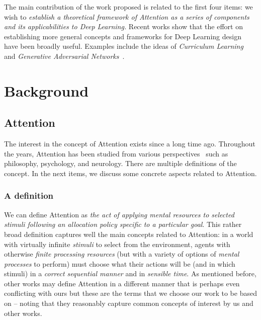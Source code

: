 \documentclass[English]{style/ic-tese-v3}
\begin{document}
The main contribution of the work proposed is related to the first four items:
we wish to
\emph{establish a theoretical framework of Attention as a series of components
    and its applicabilities to Deep Learning.}
Recent works show that the effort on establishing more general concepts and frameworks for
Deep Learning design have been broadly useful.
Examples include the ideas of \emph{Curriculum Learning}~\cite{ref:curriculum}
and \emph{Generative Adversarial Networks}~\cite{ref:gans}.

\chapter{Background}
\section{Attention}
\label{attention}
The interest in the concept of Attention exists since a long time ago.
Throughout the years, Attention has been studied
from various perspectives~\cite{ref:esther-thesis}
such as philosophy, psychology, and neurology.
There are multiple definitions of the concept.
In the next items, we discuss some concrete aspects related to Attention.

\subsection{A definition}
We can define Attention as
\emph{the act of applying mental resources to selected stimuli following an allocation policy specific to
    a particular goal}.
This rather broad definition captures well the main concepts related to Attention:
in a world with virtually infinite
\emph{stimuli} to select from the environment, agents with otherwise \emph{finite processing
resources} (but with a variety of options of \emph{mental processes} to perform) must choose what their
actions will be (and in which stimuli) in a \emph{correct sequential manner} and in \emph{sensible time}.
As mentioned before, other works may define Attention in a different manner
that is perhaps even conflicting with ours but
these are the terms that we choose our work to be based on -- noting that they
reasonably capture common concepts of interest by us and other works.~\cite{ref:helgason}
\end{document}
